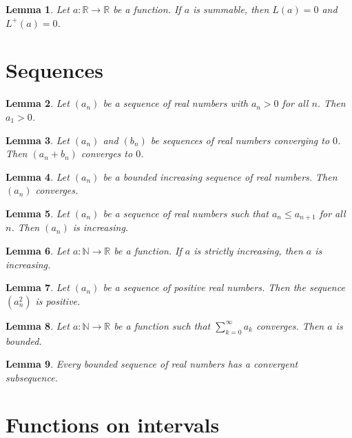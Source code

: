 \documentclass{article}
\newtheorem{lemma}{Lemma}
\begin{document}
\begin{lemma}\label{limit}
Let $a:\mathbb{R}\to\mathbb{R}$ be a function. If $a$ is summable, then $L(a)=0$ and $L^+(a)=0$.
\end{lemma}

\section{Sequences}

\begin{lemma}\label{terms}
Let $(a_n)$ be a sequence of real numbers with $a_n>0$ for all $n$. Then $a_1>0$.
\end{lemma}

\begin{lemma}\label{sum-of-null}
Let $(a_n)$ and $(b_n)$ be sequences of real numbers converging to $0$. Then $(a_n+b_n)$ converges to $0$.
\end{lemma}

\begin{lemma}\label{monotone-convergence}
Let $(a_n)$ be a bounded increasing sequence of real numbers. Then $(a_n)$ converges.
\end{lemma}

\begin{lemma}\label{increasing}
Let $(a_n)$ be a sequence of real numbers such that $a_n\le a_{n+1}$ for all $n$. Then $(a_n)$ is increasing.
\end{lemma}

\begin{lemma}\label{on-naturals}
Let $a\colon\mathbb{N}\to\mathbb{R}$ be a function. If $a$ is strictly increasing, then $a$ is increasing.
\end{lemma}

\begin{lemma}\label{squares}
Let $(a_n)$ be a sequence of positive real numbers. Then the sequence $(a_n^2)$ is positive.
\end{lemma}

\begin{lemma}\label{series-converges}
Let $a\colon\mathbb{N}\to\mathbb{R}$ be a function such that $\sum_{k=0}^\infty a_k$ converges. Then $a$ is bounded.
\end{lemma}

\begin{lemma}\label{bolzano-weierstrass}
Every bounded sequence of real numbers has a convergent subsequence.
\end{lemma}

\section{Functions on intervals}
\end{document}
